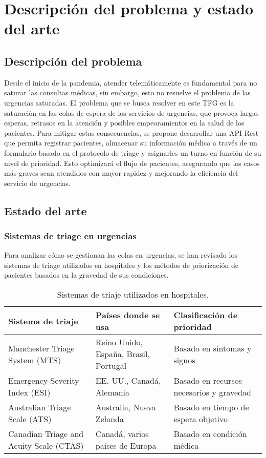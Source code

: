 
\chapter{Descripción del problema y estado del arte}

\section*{Descripción del problema}

Desde el inicio de la pandemia, atender telemáticamente es fundamental para no saturar las consultas médicas, sin embargo, esto no resuelve el problema de las urgencias saturadas.
El problema que se busca resolver en este TFG es la saturación en las colas de espera de los servicios de urgencias, que provoca largas esperas,
retrasos en la atención y posibles empeoramientos en la salud de los pacientes. Para mitigar estas consecuencias, se propone desarrollar una API Rest que
permita registrar pacientes, almacenar su información médica a través de un formulario basado en el protocolo de triage y asignarles un turno en función de
su nivel de prioridad. Esto optimizará el flujo de pacientes, asegurando que los casos más graves sean atendidos con mayor rapidez y mejorando la eficiencia
del servicio de urgencias.

\section{Estado del arte}

\subsection{Sistemas de triage en urgencias}

Para analizar cómo se gestionan las colas en urgencias, se han revisado los sistemas de triage utilizados en hospitales y los métodos de priorización de pacientes basados en la gravedad de sus condiciones.

\begin{table}[h!]
    \centering
    \caption{Sistemas de triaje utilizados en hospitales.}
    \begin{tabular}{ |p{4.5cm}|p{5cm}|p{5cm}| }
        \hline
        \textbf{Sistema de triaje}              & \textbf{Países donde se usa}          & \textbf{Clasificación de prioridad}      \\
        \hline
        Manchester Triage System (MTS)          & Reino Unido, España, Brasil, Portugal & Basado en síntomas y signos              \\
        Emergency Severity Index (ESI)          & EE. UU., Canadá, Alemania             & Basado en recursos necesarios y gravedad \\
        Australian Triage Scale (ATS)           & Australia, Nueva Zelanda              & Basado en tiempo de espera objetivo      \\
        Canadian Triage and Acuity Scale (CTAS) & Canadá, varios países de Europa       & Basado en condición médica               \\
        \hline
    \end{tabular}
\end{table}

